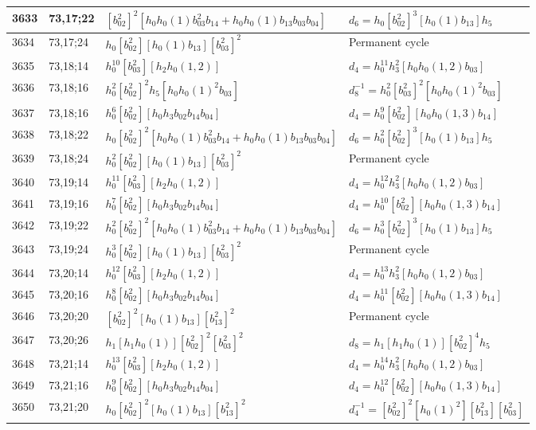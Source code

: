 \documentclass{article}
\begin{document}
\begin{longtable}{|l|l|>{\raggedright\arraybackslash}p{6cm}|>{\raggedright\arraybackslash}p{6cm}|}
\hline
3633 & 73,17;22 & $[b_{02}^2]^2[h_0h_0(1)b_{03}^2b_{14} + h_0h_0(1)b_{13}b_{03}b_{04}]$ &$d_{6}=h_0[b_{02}^2]^3[h_0(1)b_{13}]h_5$\\
\hline
3634 & 73,17;24 & $h_0[b_{02}^2][h_0(1)b_{13}][b_{03}^2]^2$ & Permanent cycle\\
\hline
3635 & 73,18;14 & $h_0^{10}[b_{03}^2][h_2h_0(1, 2)]$ &$d_{4}=h_0^{11}h_3^2[h_0h_0(1, 2)b_{03}]$\\
\hline
3636 & 73,18;16 & $h_0^2[b_{02}^2]^2h_5[h_0h_0(1)^2b_{03}]$ & $d_{8}^{-1}=h_0^2[b_{03}^2]^2[h_0h_0(1)^2b_{03}]$\\
3637 & 73,18;16 & $h_0^6[b_{02}^2][h_0h_3b_{02}b_{14}b_{04}]$ &$d_{4}=h_0^9[b_{02}^2][h_0h_0(1, 3)b_{14}]$\\
\hline
3638 & 73,18;22 & $h_0[b_{02}^2]^2[h_0h_0(1)b_{03}^2b_{14} + h_0h_0(1)b_{13}b_{03}b_{04}]$ &$d_{6}=h_0^2[b_{02}^2]^3[h_0(1)b_{13}]h_5$\\
\hline
3639 & 73,18;24 & $h_0^2[b_{02}^2][h_0(1)b_{13}][b_{03}^2]^2$ & Permanent cycle\\
\hline
3640 & 73,19;14 & $h_0^{11}[b_{03}^2][h_2h_0(1, 2)]$ &$d_{4}=h_0^{12}h_3^2[h_0h_0(1, 2)b_{03}]$\\
\hline
3641 & 73,19;16 & $h_0^7[b_{02}^2][h_0h_3b_{02}b_{14}b_{04}]$ &$d_{4}=h_0^{10}[b_{02}^2][h_0h_0(1, 3)b_{14}]$\\
\hline
3642 & 73,19;22 & $h_0^2[b_{02}^2]^2[h_0h_0(1)b_{03}^2b_{14} + h_0h_0(1)b_{13}b_{03}b_{04}]$ &$d_{6}=h_0^3[b_{02}^2]^3[h_0(1)b_{13}]h_5$\\
\hline
3643 & 73,19;24 & $h_0^3[b_{02}^2][h_0(1)b_{13}][b_{03}^2]^2$ & Permanent cycle\\
\hline
3644 & 73,20;14 & $h_0^{12}[b_{03}^2][h_2h_0(1, 2)]$ &$d_{4}=h_0^{13}h_3^2[h_0h_0(1, 2)b_{03}]$\\
\hline
3645 & 73,20;16 & $h_0^8[b_{02}^2][h_0h_3b_{02}b_{14}b_{04}]$ &$d_{4}=h_0^{11}[b_{02}^2][h_0h_0(1, 3)b_{14}]$\\
\hline
3646 & 73,20;20 & $[b_{02}^2]^2[h_0(1)b_{13}][b_{13}^2]^2$ & Permanent cycle\\
\hline
3647 & 73,20;26 & $h_1[h_1h_0(1)][b_{02}^2]^2[b_{03}^2]^2$ &$d_{8}=h_1[h_1h_0(1)][b_{02}^2]^4h_5$\\
\hline
3648 & 73,21;14 & $h_0^{13}[b_{03}^2][h_2h_0(1, 2)]$ &$d_{4}=h_0^{14}h_3^2[h_0h_0(1, 2)b_{03}]$\\
\hline
3649 & 73,21;16 & $h_0^9[b_{02}^2][h_0h_3b_{02}b_{14}b_{04}]$ &$d_{4}=h_0^{12}[b_{02}^2][h_0h_0(1, 3)b_{14}]$\\
\hline
3650 & 73,21;20 & $h_0[b_{02}^2]^2[h_0(1)b_{13}][b_{13}^2]^2$ & $d_{4}^{-1}=[b_{02}^2]^2[h_0(1)^2][b_{13}^2][b_{03}^2]$\\

\end{longtable}
\end{document}
